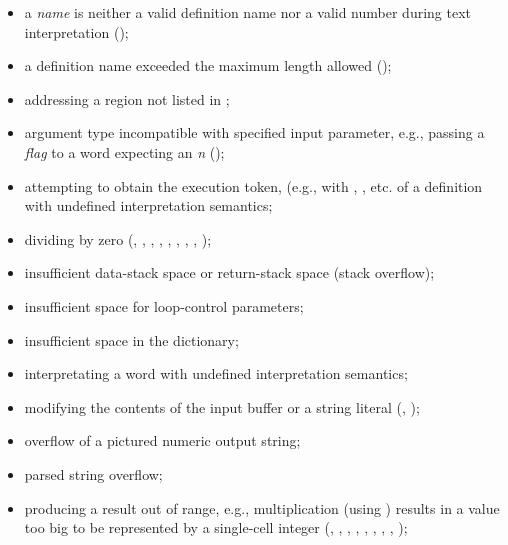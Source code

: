 \begin{itemize}

\item a \emph{name} is neither a valid definition name nor a valid
	number during text interpretation ();

\item a definition name exceeded the maximum length allowed
	();

\item addressing a region not listed in ;

\item argument type incompatible with specified input parameter,
	e.g., passing a \emph{flag} to a word expecting an \emph{n}
	();

\item attempting to obtain the execution token, (e.g., with
	, , etc. of a definition
	with undefined interpretation semantics;

\item dividing by zero
	(,
	 ,
	 ,
	 ,
	 ,
	 ,
	 ,
	 ,
	 );

\item insufficient data-stack space or return-stack space (stack
	overflow);

\item insufficient space for loop-control parameters;

\item insufficient space in the dictionary;

\item interpretating a word with undefined interpretation semantics;

\item modifying the contents of the input buffer or a string literal
	(,
	);

\item overflow of a pictured numeric output string;

\item parsed string overflow;

\item producing a result out of range, e.g., multiplication
	(using \word{*}) results in a value too big to be represented by
	a single-cell integer
	(,
	 ,
	 ,
	 ,
	 ,
	 ,
	 ,
	 ,
	 );


\end{itemize}
